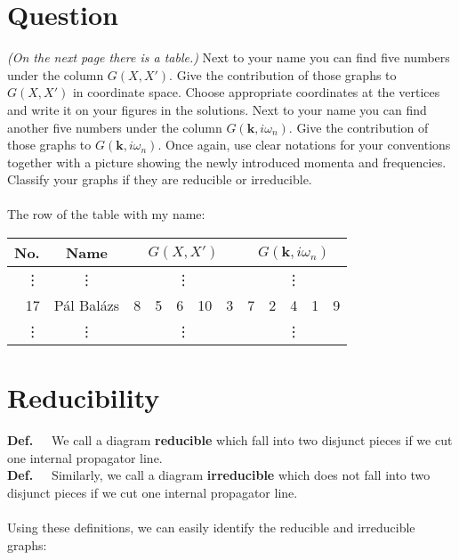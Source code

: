 \section*{Question}
\textit{(On the next page there is a table.)} Next to your name you can find five numbers under the column $G \left( X, X' \right)$. Give the contribution of those graphs to $G \left( X, X' \right)$ in coordinate space. Choose appropriate coordinates at the vertices and write it on your figures in the solutions. Next to your name you can find another five numbers under the column $G \left( \boldsymbol{k}, i \omega_{n} \right)$. Give the contribution of those graphs to $G \left( \boldsymbol{k}, i \omega_{n} \right)$. Once again, use clear notations for your conventions together with a picture showing the newly introduced momenta and frequencies. Classify your graphs if they are reducible or irreducible. \\ \\
The row of the table with my name:
\begin{center}
\begin{tabular}{|r|c|c|c|c|c|c||c|c|c|c|c|}
\hline
No.    & Name       & \multicolumn{5}{c||}{$G \left( X, X' \right)$} & \multicolumn{5}{c|}{$G \left( \boldsymbol{k}, i \omega_{n} \right)$} \\
\hline
\vdots & \vdots     & \multicolumn{5}{c||}{\vdots}                   & \multicolumn{5}{c|}{\vdots}        \\
\hline
17     & Pál Balázs &  8  &  5  &  6  &  10  &  3                    &  7  &  2  &  4  &  1  &  9         \\
\hline
\vdots & \vdots     & \multicolumn{5}{c||}{\vdots}                   & \multicolumn{5}{c|}{\vdots}        \\
\hline
\end{tabular}
\end{center}

\section*{Reducibility}

\textbf{Def.}\ \ \ We call a diagram \textbf{reducible} which fall into two disjunct pieces if we cut one internal propagator line. \\
\textbf{Def.}\ \ \ Similarly, we call a diagram \textbf{irreducible} which does not fall into two disjunct pieces if we cut one internal propagator line. \\ \\
Using these definitions, we can easily identify the reducible and irreducible graphs:

